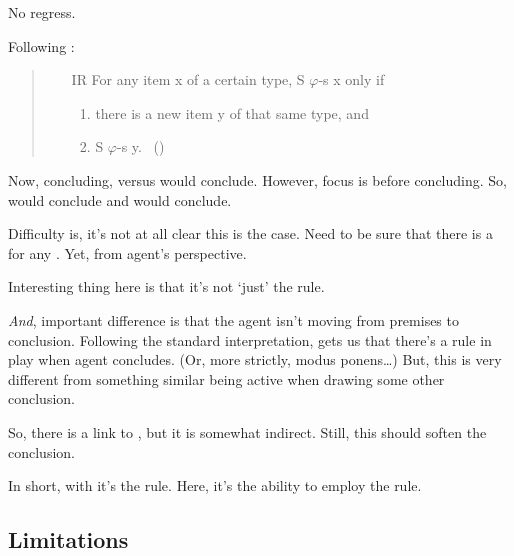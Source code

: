 \begin{note}
  No regress.

  Following \citeauthor{Wieland:2013vf}:

  \begin{quote}
    \begin{itemize}[noitemsep]
    \item[IR]
      For any item x of a certain type, S \(\varphi\)-s x only if
      \begin{enumerate}[label=(\roman*),noitemsep]
      \item
        there is a new item y of that same type, and
      \item
        S \(\varphi\)-s y.%
        \mbox{ }\hfill\mbox{(\citeyear[996]{Wieland:2013vf})}
      \end{enumerate}
    \end{itemize}
  \end{quote}

  Now, concluding, versus would conclude.
  However, focus is before concluding.
  So, would conclude and would conclude.

  Difficulty is, it's not at all clear this is the case.
  Need to be sure that there is a \requ{} for any \requ{}.
  Yet, from agent's perspective.
\end{note}


\begin{note}
  Interesting thing here is that it's not `just' the rule.

  \emph{And}, important difference is that the agent isn't moving from premises to conclusion.
  Following the standard interpretation, \citeauthor{Carroll:1895uj} gets us that there's a rule in play when agent concludes.
  (Or, more strictly, modus ponens\dots)
  But, this is very different from something similar being active when drawing some other conclusion.

  So, there is a link to \citeauthor{Carroll:1895uj}, but it is somewhat indirect.
  Still, this should soften the conclusion.

  In short, with \citeauthor{Carroll:1895uj} it's the rule.
  Here, it's the ability to employ the rule.
\end{note}

\subsection{Limitations}

